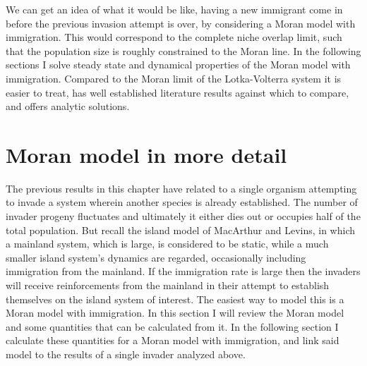 We can get an idea of what it would be like, having a new immigrant come in before the previous invasion attempt is over, by considering a Moran model with immigration.
This would correspond to the complete niche overlap limit, such that the population size is roughly constrained to the Moran line. 
In the following sections I solve steady state and dynamical properties of the Moran model with immigration. 
Compared to the Moran limit of the Lotka-Volterra system it is easier to treat, has well established literature results against which to compare, and offers analytic solutions. 


\section{Moran model in more detail}
The previous results in this chapter have related to a single organism attempting to invade a system wherein another species is already established. 
The number of invader progeny fluctuates and ultimately it either dies out or occupies half of the total population. 
But recall the island model of MacArthur and Levins, in which a mainland system, which is large, is considered to be static, while a much smaller island system's dynamics are regarded, occasionally including immigration from the mainland. 
If the immigration rate is large then the invaders will receive reinforcements from the mainland in their attempt to establish themselves on the island system of interest. 
The easiest way to model this is a Moran model with immigration. 
In this section I will review the Moran model and some quantities that can be calculated from it. 
In the following section I calculate these quantities for a Moran model with immigration, and link said model to the results of a single invader analyzed above. 

